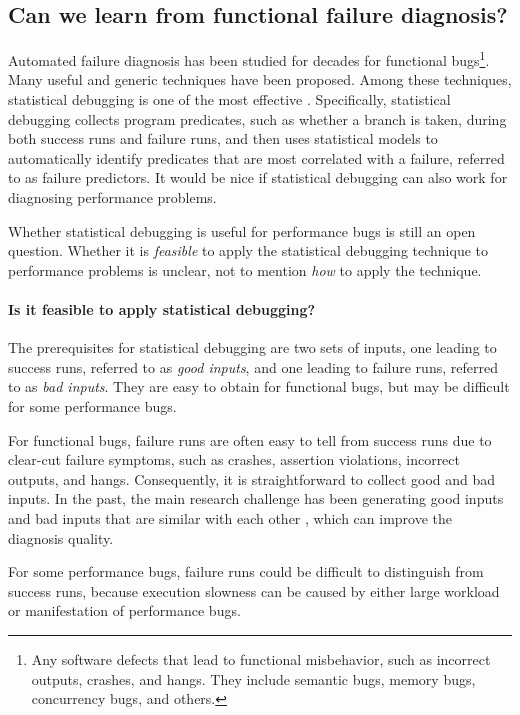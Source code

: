 \subsection{Can we learn from functional failure diagnosis?}
\label{sec:canwe}
Automated failure diagnosis has been studied for decades for functional 
bugs\footnote{Any software defects that lead to functional misbehavior,
such as incorrect outputs, crashes, and hangs. They include
semantic bugs, memory bugs, concurrency bugs, and others.}. 
Many useful and generic techniques
\cite{horwitz, xiangyu.ase05, delta,liblit03,CCI,tarantula1} have been proposed.
Among these techniques,
statistical debugging is one of the most effective
\cite{liblit03,CCI,tarantula1}. 
Specifically, statistical debugging
collects program predicates, such as
whether a branch is taken, during both success runs and failure runs, and
then uses
statistical models to automatically identify predicates that are most
correlated with a failure, referred to as failure predictors.
It would be nice if statistical debugging can also work for diagnosing
performance problems.

Whether statistical debugging is useful for performance bugs is 
still an open question. Whether it is \textit{feasible} to apply
the statistical debugging technique to performance problems is unclear, 
not to mention 
\textit{how} to apply the technique.

\paragraph{Is it feasible to apply statistical debugging?}
The prerequisites for statistical debugging are two sets of inputs, one
leading to success runs, referred to as \emph{good inputs}, and one leading to 
failure runs, referred to as \emph{bad inputs}.
They are easy to obtain for functional bugs, but may be difficult for some
performance bugs.

For functional bugs, failure runs are often easy to tell from success runs 
due to clear-cut failure symptoms, such as 
crashes, assertion violations, incorrect outputs, and hangs. Consequently, 
it is straightforward to collect good and bad inputs. 
In the past, the main research challenge has been generating good inputs and 
bad inputs
that are similar with each other \cite{delta}, which can improve the diagnosis
quality.

For some performance bugs, failure runs could be difficult to distinguish
from success runs, because execution slowness can be
caused by either large workload or manifestation of performance bugs.

